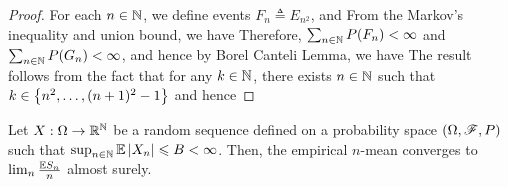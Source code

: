 \documentclass[letterpaper,10pt,english]{article}
\begin{document}
\begin{proof} 
For each $n \in \mathbb{N}$, we define events $F_n \triangleq E_{n^2}$, and 
From the Markov's inequality and union bound, we have 
Therefore, $\sum_{n \in \mathbb{N}}P(F_n) < \infty$ and $\sum_{n \in \mathbb{N}}P(G_n) < \infty$, 
and hence by Borel Canteli Lemma, 
we have 
The result follows from the fact that for any $k \in \mathbb{N}$, there exists $n \in \mathbb{N}$  such that $k \in \left\{n^2, \dots, (n+1)^2-1\right\}$ and hence 
\end{proof}
\begin{thm} 
Let $X:\Omega\to\mathbb{R}^{\mathbb{N}}$ be a random sequence defined on a probability space $(\Omega,\mathscr{F},P)$ such that $\sup_{n\in\mathbb{N}}\mathbb{E}\left\lvert X_n\right\rvert \leqslant B < \infty$. %
Then, the empirical $n$-mean converges to $\lim_n\frac{\mathbb{E} S_n}{n}$ almost surely.
\end{thm}
\end{document}
